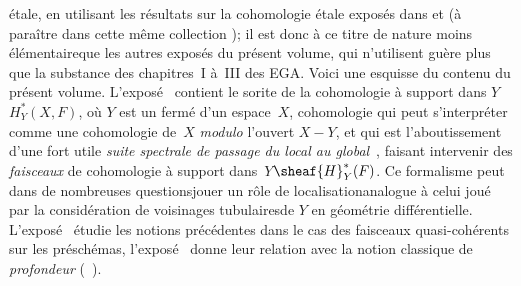 \'etale, en utilisant les r\'esultats sur la cohomologie \'etale expos\'es dans  et  (\`a para\^itre dans cette m\^eme collection ); il est donc \`a ce titre de nature moins \og \'el\'ementaire\fg que les autres expos\'es du pr\'esent volume, qui n'utilisent gu\`ere plus que la substance des chapitres~I \`a~III des EGA. Voici une esquisse du contenu du pr\'esent volume. L'expos\'e~ contient le sorite de la \og cohomologie \`a support dans $Y$\fg $H^*_Y(X, F)$, o\`u $Y$ est un ferm\'e d'un espace~$X$, cohomologie qui peut s'interpr\'eter comme une cohomologie de~$X$ \emph{modulo} l'ouvert $X-Y$, et qui est l'aboutissement d'une fort utile \og \emph{suite spectrale de passage du local au global}\fg {}~, faisant intervenir des \emph{faisceaux} de cohomologie \og \`a support dans~$Y$\fg $\sheaf{H}^*_Y(F)$. Ce formalisme peut dans de nombreuses questions\pageoriginale jouer un r\^{o}le de \og localisation\fg analogue \`a celui jou\'e par la consid\'eration de voisinages \og tubulaires\fg de $Y$ en g\'eom\'etrie diff\'erentielle. L'expos\'e~ \'etudie les notions pr\'ec\'edentes dans le cas des faisceaux quasi-coh\'erents sur les pr\'esch\'emas, l'expos\'e~ donne leur relation avec la notion classique de \emph{profondeur} (~).

